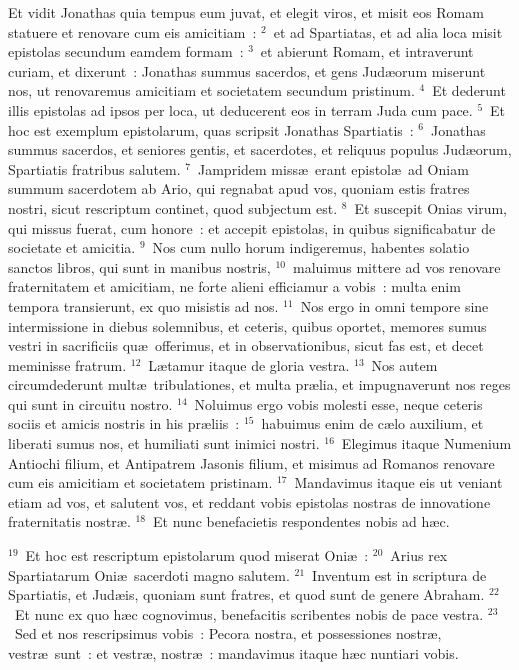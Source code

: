 \lettrine[lines=3,image=true,loversize=0.05,lraise=-0.03]{E}{}t vidit Jonathas quia tempus eum juvat, et elegit viros, et misit eos Romam statuere et renovare cum eis amicitiam~:
${}^{2}$~et ad Spartiatas, et ad alia loca misit epistolas secundum eamdem formam~:
${}^{3}$~et abierunt Romam, et intraverunt curiam, et dixerunt~: Jonathas summus sacerdos, et gens Jud\ae orum miserunt nos, ut renovaremus amicitiam et societatem secundum pristinum.
${}^{4}$~Et dederunt illis epistolas ad ipsos per loca, ut deducerent eos in terram Juda cum pace.
${}^{5}$~Et hoc est exemplum epistolarum, quas scripsit Jonathas Spartiatis~:
${}^{6}$~Jonathas summus sacerdos, et seniores gentis, et sacerdotes, et reliquus populus Jud\ae orum, Spartiatis fratribus salutem.
${}^{7}$~Jampridem miss\ae\ erant epistol\ae\ ad Oniam summum sacerdotem ab Ario, qui regnabat apud vos, quoniam estis fratres nostri, sicut rescriptum continet, quod subjectum est.
${}^{8}$~Et suscepit Onias virum, qui missus fuerat, cum honore~: et accepit epistolas, in quibus significabatur de societate et amicitia.
${}^{9}$~Nos cum nullo horum indigeremus, habentes solatio sanctos libros, qui sunt in manibus nostris,
${}^{10}$~maluimus mittere ad vos renovare fraternitatem et amicitiam, ne forte alieni efficiamur a vobis~: multa enim tempora transierunt, ex quo misistis ad nos.
${}^{11}$~Nos ergo in omni tempore sine intermissione in diebus solemnibus, et ceteris, quibus oportet, memores sumus vestri in sacrificiis qu\ae\ offerimus, et in observationibus, sicut fas est, et decet meminisse fratrum.
${}^{12}$~L\ae tamur itaque de gloria vestra.
${}^{13}$~Nos autem circumdederunt mult\ae\ tribulationes, et multa pr\ae lia, et impugnaverunt nos reges qui sunt in circuitu nostro.
${}^{14}$~Noluimus ergo vobis molesti esse, neque ceteris sociis et amicis nostris in his pr\ae liis~:
${}^{15}$~habuimus enim de c\ae lo auxilium, et liberati sumus nos, et humiliati sunt inimici nostri.
${}^{16}$~Elegimus itaque Numenium Antiochi filium, et Antipatrem Jasonis filium, et misimus ad Romanos renovare cum eis amicitiam et societatem pristinam.
${}^{17}$~Mandavimus itaque eis ut veniant etiam ad vos, et salutent vos, et reddant vobis epistolas nostras de innovatione fraternitatis nostr\ae .
${}^{18}$~Et nunc benefacietis respondentes nobis ad h\ae c.


${}^{19}$~Et hoc est rescriptum epistolarum quod miserat Oni\ae~:
${}^{20}$~Arius rex Spartiatarum Oni\ae\ sacerdoti magno salutem.
${}^{21}$~Inventum est in scriptura de Spartiatis, et Jud\ae is, quoniam sunt fratres, et quod sunt de genere Abraham.
${}^{22}$~Et nunc ex quo h\ae c cognovimus, benefacitis scribentes nobis de pace vestra.
${}^{23}$~Sed et nos rescripsimus vobis~: Pecora nostra, et possessiones nostr\ae , vestr\ae\ sunt~: et vestr\ae , nostr\ae~: mandavimus itaque h\ae c nuntiari vobis.


